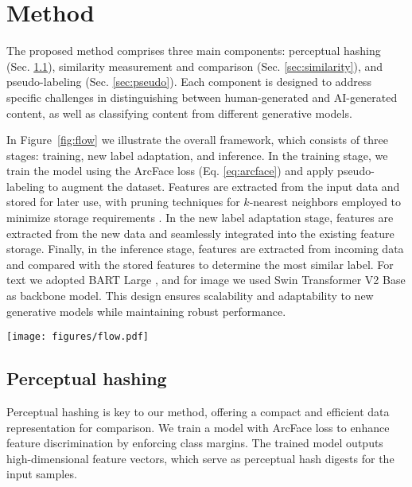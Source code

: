 \section{Method}
\label{sec:method}
The proposed method comprises three main components: perceptual hashing (Sec. \ref{sec:hashing}), similarity measurement and comparison (Sec. \ref{sec:similarity}), and pseudo-labeling (Sec. \ref{sec:pseudo}). Each component is designed to address specific challenges in distinguishing between human-generated and AI-generated content, as well as classifying content from different generative models. 

In Figure~\ref{fig:flow} we illustrate the overall framework, which consists of three stages: training, new label adaptation, and inference. In the training stage, we train the model using the ArcFace loss (Eq. \eqref{eq:arcface}) and apply pseudo-labeling to augment the dataset. Features are extracted from the input data and stored for later use, with pruning techniques for $k$-nearest neighbors employed to minimize storage requirements \cite{pedregosa2011scikit}. In the new label adaptation stage, features are extracted from the new data and seamlessly integrated into the existing feature storage. Finally, in the inference stage, features are extracted from incoming data and compared with the stored features to determine the most similar label. For text we adopted BART Large \cite{lewis2019bart}, and for image we used Swin Transformer V2 Base \cite{liu2022swin} as backbone model. This design ensures scalability and adaptability to new generative models while maintaining robust performance. 

\begin{figure*}[h]
    \centering
    \texttt{[image: figures/flow.pdf]}
    \caption{\small Overall framework of the proposed method, which consists of three stages, \ie, training, new label adaptation, and inference.}
    \label{fig:flow}
\end{figure*}


\subsection{Perceptual hashing}
\label{sec:hashing}
Perceptual hashing is key to our method, offering a compact and efficient data representation for comparison. We train a model with ArcFace loss \cite{deng2019arcface} to enhance feature discrimination by enforcing class margins. The trained model outputs high-dimensional feature vectors, which serve as perceptual hash digests for the input samples.

